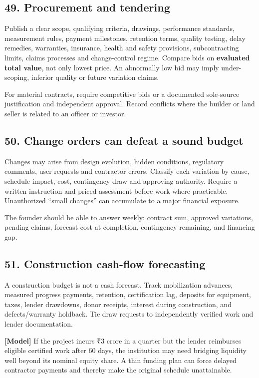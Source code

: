 \subsection{49. Procurement and tendering}

Publish a clear scope, qualifying criteria, drawings, performance standards, measurement rules, payment milestones, retention terms, quality testing, delay remedies, warranties, insurance, health and safety provisions, subcontracting limits, claims processes and change-control regime. Compare bids on \textbf{evaluated total value}, not only lowest price. An abnormally low bid may imply under-scoping, inferior quality or future variation claims.

For material contracts, require competitive bids or a documented sole-source justification and independent approval. Record conflicts where the builder or land seller is related to an officer or investor.


\subsection{50. Change orders can defeat a sound budget}

Changes may arise from design evolution, hidden conditions, regulatory comments, user requests and contractor errors. Classify each variation by cause, schedule impact, cost, contingency draw and approving authority. Require a written instruction and priced assessment before work where practicable. Unauthorized ``small changes'' can accumulate to a major financial exposure.

The founder should be able to answer weekly: contract sum, approved variations, pending claims, forecast cost at completion, contingency remaining, and financing gap.


\subsection{51. Construction cash-flow forecasting}

A construction budget is not a cash forecast. Track mobilization advances, measured progress payments, retention, certification lag, deposits for equipment, taxes, lender drawdowns, donor receipts, interest during construction, and defects/warranty holdback. Tie draw requests to independently verified work and lender documentation.

\textbf{[Model]} If the project incurs \textnormal{₹}3 crore in a quarter but the lender reimburses eligible certified work after 60 days, the institution may need bridging liquidity well beyond its nominal equity share. A thin funding plan can force delayed contractor payments and thereby make the original schedule unattainable.


